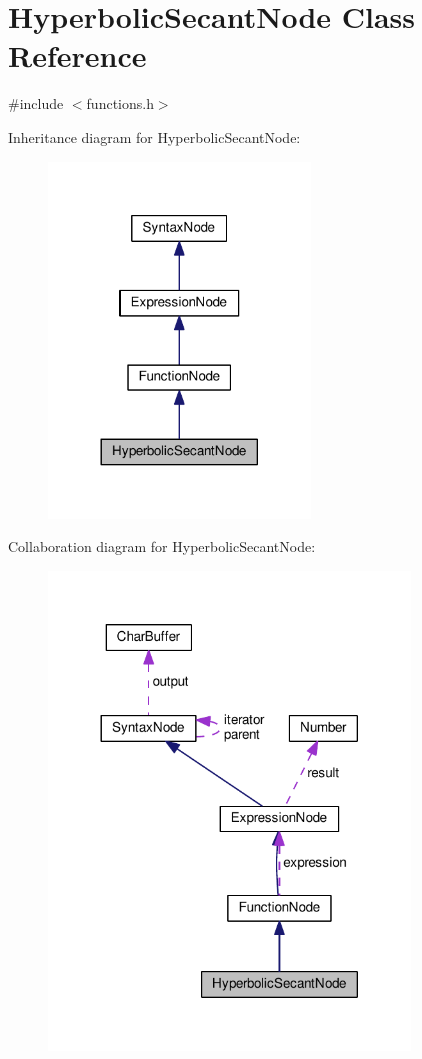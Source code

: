 \hypertarget{classHyperbolicSecantNode}{}\section{Hyperbolic\+Secant\+Node Class Reference}
\label{classHyperbolicSecantNode}


{\ttfamily \#include $<$functions.\+h$>$}



Inheritance diagram for Hyperbolic\+Secant\+Node\+:
\nopagebreak
\begin{figure}[H]
\begin{center}
\leavevmode
\includegraphics[width=197pt]{d9/d4c/classHyperbolicSecantNode__inherit__graph}
\end{center}
\end{figure}


Collaboration diagram for Hyperbolic\+Secant\+Node\+:
\nopagebreak
\begin{figure}[H]
\begin{center}
\leavevmode
\includegraphics[width=272pt]{d6/df7/classHyperbolicSecantNode__coll__graph}
\end{center}
\end{figure}
